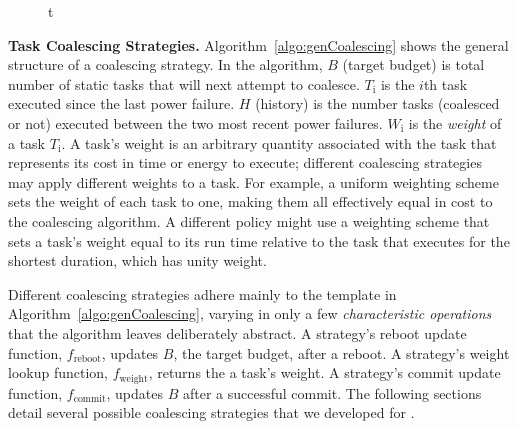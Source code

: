 \begin{figure}{t}
\end{figure}

%
%

\noindent \textbf{Task Coalescing Strategies.} Algorithm~\ref{algo:genCoalescing} shows the general structure of a coalescing strategy. In the algorithm, $B$ (target budget) is total number of static tasks
that \sys will next attempt to coalesce. $T_\text{i}$ is the $i$th task
executed since the last power failure. $H$ (history) is the number tasks
(coalesced or not) executed between the two most recent power failures.
$W_\text{i}$ is the {\em weight} of a task $T_\text{i}$.  A task's weight is an
arbitrary quantity associated with the task that represents its cost in time or
energy to execute; different coalescing strategies may apply different weights
to a task.  For example, a uniform weighting scheme sets the weight of each
task to one, making them all effectively equal in cost to the coalescing
algorithm.  A different policy might use a weighting scheme that sets a task's
weight equal to its run time relative to the task that executes for the
shortest duration, which has unity weight. 

Different coalescing strategies adhere mainly to the template in
Algorithm~\ref{algo:genCoalescing}, varying in only a few {\em characteristic
operations} that the algorithm leaves deliberately abstract.  A strategy's
reboot update function, $f_\text{reboot}$, updates $B$, the target budget,
after a reboot. A strategy's weight lookup function, $f_\text{weight}$, returns
the a task's weight.  A strategy's commit update function, $f_\text{commit}$,
updates $B$ after a successful commit. The following sections detail several
possible coalescing strategies that we developed for \sys. 


